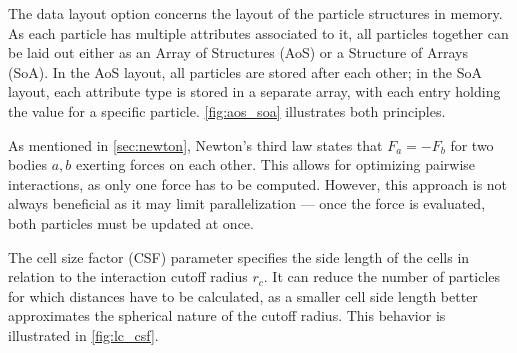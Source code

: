 \begin{description}[leftmargin=!,labelwidth=\widthof{\textbf{Cell Size Factor}}]
	\item[\textbf{Data Layout}] The data layout option concerns the layout of the particle structures in memory. As each particle has multiple attributes associated to it, all particles together can be laid out either as an Array of Structures (AoS) or a Structure of Arrays (SoA). In the AoS layout, all particles are stored after each other; in the SoA layout, each attribute type is stored in a separate array, with each entry holding the value for a specific particle. \autoref{fig:aos_soa} illustrates both principles.
	\item[\textbf{Newton3}] As mentioned in \autoref{sec:newton}, Newton's third law states that $F_a = -F_b$ for two bodies $a, b$ exerting forces on each other. This allows for optimizing pairwise interactions, as only one force has to be computed. However, this approach is not always beneficial as it may limit parallelization --- once the force is evaluated, both particles must be updated at once.
	\item[\textbf{Cell Size Factor}] The cell size factor (CSF) parameter specifies the side length of the cells in relation to the interaction cutoff radius $r_c$. It can reduce the number of particles for which distances have to be calculated, as a smaller cell side length better approximates the spherical nature of the cutoff radius. This behavior is illustrated in  \autoref{fig:lc_csf}.
\end{description}


